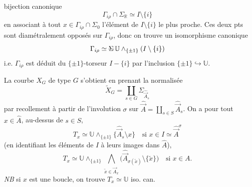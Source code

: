 \documentclass[11pt,a4paper]{article}
\begin{document}

bijection canonique
\[
\Gamma_{i\rho} \cap \Sigma_{\mathbb{R}} \simeq I \setminus \{i\}
\]
en associant à tout $x \in \Gamma_{i\rho} \cap \Sigma_0$ l'élément de
$I \setminus \{i\}$ le plus proche. Ces deux pts sont diamétralement opposés
sur $\Gamma_{i\rho}$, donc on trouve un isomorphisme canonique
\[
\Gamma_{i\rho} \simeq \text{\struck{$\Sigma$}}\, \mathbb{U} \wedge_{\{\pm 1\}} (I \setminus \{i\})
\]
i.e. $\Gamma_{i\rho}$ est déduit du $\{\pm 1\}$-torseur $I - \{i\}$ par
l'inclusion  $\{\pm 1\} \hookrightarrow \mathbb{U}$.

 La courbe $X_G$ de type $G$ s'obtient en prenant la
normalisée
\[
\widetilde{X}_G = \coprod_{s \in G} \Sigma_{\hat{\vec{A}}_s}
\]
par recollement à partir de l'involution $\sigma$ sur
$\hat{\vec{A}} = \coprod_{s \in S} \hat{\vec{A}}_s$. On a pour tout
$x \in \hat{A}$, au-dessus de $s \in S$,
\[
T_x \simeq \mathbb{U} \wedge_{\{\pm 1\}} \{ \hat{\vec{A}}_s \setminus x \}
\quad \text{si } x \in I \simeq \hat{\vec{A}}^{\sigma}
\]
(en identifiant les éléments de $I$ à leurs images dans $\hat{A}$),
\[
T_x \simeq \mathbb{U} \wedge_{\{\pm 1\}} \bigwedge_{\tilde{x} \in \hat{\vec{A}}_x}
\bigl( \hat{\vec{A}}_{\sigma(\tilde{x})} \setminus \{\tilde{x}\} \bigr)
\quad \text{si } x \in A .
\]
\textit{NB} si $x$ est une boucle, on trouve $T_x \simeq \mathbb{U}$ iso. can.

\end{document}

